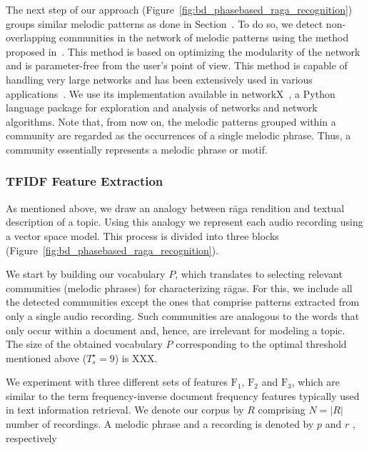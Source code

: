 The next step of our approach (Figure~\ref{fig:bd_phasebased_raga_recognition}) groups similar melodic patterns as done in Section~. To do so, we detect non-overlapping communities in the network of melodic patterns using the method proposed in~\cite{blondel2008fast}. This method is based on optimizing the modularity of the network and is parameter-free from the user's point of view. This method is capable of handling very large networks and has been extensively used in various applications~\cite{fortunato2010community}. We use its implementation available in networkX~\cite{hagberg-2008-exploring}, a Python language package for exploration and analysis of networks and network algorithms. Note that, from now on, the melodic patterns grouped within a community are regarded as the occurrences of a single melodic phrase. Thus, a community essentially represents a melodic phrase or motif.

\subsubsection{TFIDF Feature Extraction}
\label{sec:vsm_feature_extraction_TFID_computation}

As mentioned above, we draw an analogy between r\={a}ga rendition and textual description of a topic. Using this analogy we represent each audio recording using a vector space model. This process is divided into three blocks (Figure~\ref{fig:bd_phasebased_raga_recognition}).

We start by building our vocabulary $P$, which translates to selecting relevant communities (melodic phrases) for characterizing r\={a}gas. For this, we include all the detected communities except the ones that comprise patterns extracted from only a single audio recording. Such communities are analogous to the words that only occur within a document and, hence, are irrelevant for modeling a topic. The size of the obtained vocabulary $P$ corresponding to the optimal threshold mentioned above ($T_{s}^\star=9$) is XXX.

We experiment with three different sets of features $\mathrm{F_1}$, $\mathrm{F_2}$ and $\mathrm{F_3}$, which are similar to the term frequency-inverse document frequency features typically used in text information retrieval. We denote our corpus by $R$  comprising $N = |R|$ number of recordings. A melodic phrase and a recording is denoted by $p$ and $r$ , respectively

